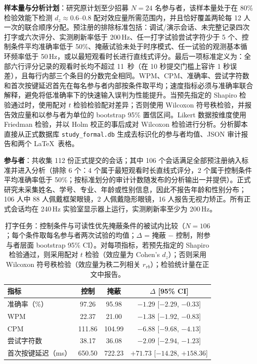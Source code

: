 \documentclass{ieeeaccess}
\begin{document}
{\textbf{样本量与分析计划}：研究原计划至少招募 $N=24$ 名参与者，该样本量处于在 80\% 检验效能下检测 $d_z\approx0.6$--$0.8$ 配对效应量所需范围内，并且恰好覆盖两轮每 12 人一次的联合顺序分配。预注册的排除标准包括：调试/演示会话、未完整记录四次打字或六次评分、实测刷新率低于 200\,Hz、任一打字试验尝试字符少于 5 个、控制条件平均准确率低于 50\%、掩蔽试验未处于时序模式、任一试验的观测基本循环频率低于 50\,Hz，或以最短观看时长进行直线式评分。最后一项标准定义为：全部六行评分记录的观看时长均不超过 11~秒（在 10 秒提交门槛上容许 1 秒误差），且每行内部三个条目的分数完全相同。WPM、CPM、准确率、尝试字符数和首次按键延迟首先在每名参与者内部按条件取平均；速度指标必须与准确率联合解释，避免将低准确率下的快速输入误判为性能提升。当预先指定的 Shapiro 检验通过时，使用配对 $t$ 检验检验配对差异；否则使用 Wilcoxon 符号秩检验，并报告效应量和以参与者为单位的 bootstrap 95\% 置信区间。Likert 数据按维度使用 Friedman 检验，并以 Holm 校正的事后成对 Wilcoxon 检验进行分析。分析脚本直接从正式数据库 \texttt{study\_formal.db} 生成去标识化的参与者均值、JSON 审计报告和两个 \LaTeX\ 表格。

\textbf{参与者}：共收集 112 份正式提交的会话；其中 106 个会话满足全部预注册纳入标准并进入分析（排除 6 个：4 个属于最短观看时长直线式评分，2 个属于控制条件平均准确率低于 50\%；按标准划分的审计计数随发布的分析输出一并提供）。正式研究未采集姓名、学号、专业、年龄或性别信息，因此不报告年龄和性别分布；106 人中 88 人佩戴框架眼镜，2 人佩戴隐形眼镜，16 人报告无视力矫正。所有正式会话均在 240\,Hz 实验室显示器上运行，实测刷新率至少为 200\,Hz。

\begin{table}[!t]
\caption{打字任务：控制条件与可读性优先掩蔽条件的被试内比较（$N=106$；每个条件取每名参与者两次试验的均值；$\Delta$ = 掩蔽 $-$ 控制，附参与者层面 bootstrap 95\% CI）。对每项指标，若预先指定的 Shapiro 检验通过，则采用配对 $t$ 检验（效应量为 Cohen's $d_z$）；否则采用 Wilcoxon 符号秩检验（效应量为秩二列相关 $r_{rb}$）；检验统计量在正文中报告。}
\label{tab:study_typing}
\centering
\footnotesize
\setlength{\tabcolsep}{4pt}
\begin{tabular}{lccc}
\toprule
指标 & 控制 & 掩蔽 & $\Delta$ [95\% CI] \\
\midrule
准确率（\%） & 97.26 & 95.98 & $-1.29$ [$-2.29$, $-0.33$] \\
WPM & 22.37 & 21.00 & $-1.38$ [$-1.92$, $-0.83$] \\
CPM & 111.86 & 104.99 & $-6.88$ [$-9.68$, $-4.13$] \\
尝试字符数 & 38.17 & 36.08 & $-2.09$ [$-2.94$, $-1.23$] \\
首次按键延迟（ms） & 650.50 & 722.23 & $+71.73$ [$-14.28$, $+158.36$] \\
\bottomrule
\end{tabular}
\end{table}

}
\end{document}
